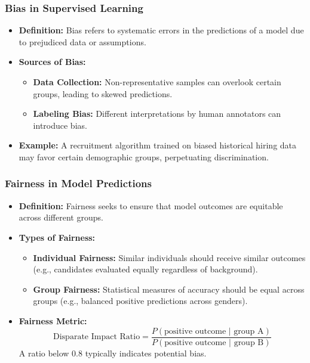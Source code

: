 \documentclass{beamer}
\begin{document}
\begin{frame}[fragile]
    \frametitle{Bias in Supervised Learning}
    \begin{itemize}
        \item \textbf{Definition:} Bias refers to systematic errors in the predictions of a model due to prejudiced data or assumptions.
        \item \textbf{Sources of Bias:}
        \begin{itemize}
            \item \textbf{Data Collection:} Non-representative samples can overlook certain groups, leading to skewed predictions.
            \item \textbf{Labeling Bias:} Different interpretations by human annotators can introduce bias.
        \end{itemize}
        \item \textbf{Example:} A recruitment algorithm trained on biased historical hiring data may favor certain demographic groups, perpetuating discrimination.
    \end{itemize}
\end{frame}

\begin{frame}[fragile]
    \frametitle{Fairness in Model Predictions}
    \begin{itemize}
        \item \textbf{Definition:} Fairness seeks to ensure that model outcomes are equitable across different groups.
        \item \textbf{Types of Fairness:}
        \begin{itemize}
            \item \textbf{Individual Fairness:} Similar individuals should receive similar outcomes (e.g., candidates evaluated equally regardless of background).
            \item \textbf{Group Fairness:} Statistical measures of accuracy should be equal across groups (e.g., balanced positive predictions across genders).
        \end{itemize}
        \item \textbf{Fairness Metric:}
        \begin{equation}
        \text{Disparate Impact Ratio} = \frac{P(\text{positive outcome | group A})}{P(\text{positive outcome | group B})}
        \end{equation}
        A ratio below 0.8 typically indicates potential bias.
    \end{itemize}
\end{frame}
\end{document}
